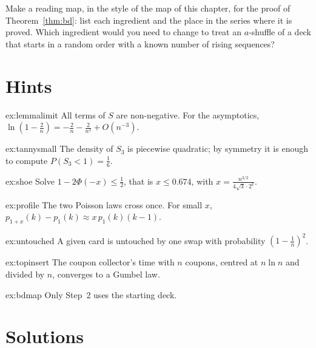 \begin{exercise}[$\star\star$]\label{ex:bdmap}
Make a reading map, in the style of the map of this chapter, for the proof of Theorem~\ref{thm:bd}: list each ingredient and the place in the series where it is proved.
Which ingredient would you need to change to treat an $a$-shuffle of a deck that starts in a random order with a known number of rising sequences?
\end{exercise}

\section{Hints}

\begin{hint}{ex:lemmalimit}
All terms of $S$ are non-negative. For the asymptotics, $\ln(1-\frac2n)=-\frac2n-\frac2{n^2}+O(n^{-3})$.
\end{hint}

\begin{hint}{ex:tannysmall}
The density of $S_3$ is piecewise quadratic; by symmetry it is enough to compute $P(S_3<1)=\frac16$.
\end{hint}

\begin{hint}{ex:shoe}
Solve $1-2\Phi(-x)\le\frac12$, that is $x\le0.674$, with $x=\frac{n^{3/2}}{4\sqrt3\cdot2^k}$.
\end{hint}

\begin{hint}{ex:profile}
The two Poisson laws cross once. For small $x$, $p_{1+x}(k)-p_1(k)\approx x\,p_1(k)(k-1)$.
\end{hint}

\begin{hint}{ex:untouched}
A given card is untouched by one swap with probability $(1-\frac1n)^2$.
\end{hint}

\begin{hint}{ex:topinsert}
The coupon collector's time with $n$ coupons, centred at $n\ln n$ and divided by $n$, converges to a Gumbel law.
\end{hint}

\begin{hint}{ex:bdmap}
Only Step~2 uses the starting deck.
\end{hint}

\section{Solutions}

